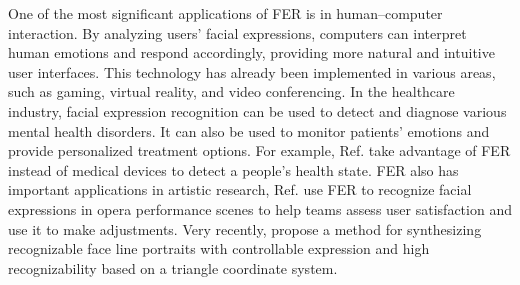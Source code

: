 \documentclass{article}
\begin{document}
One of the most significant applications of FER is in human--computer interaction. By analyzing users’ facial expressions, computers can interpret human emotions and respond accordingly, providing more natural and intuitive user interfaces. This technology has already been implemented in various areas, such as gaming, virtual reality, and video conferencing. In the healthcare industry, facial expression recognition can be used to detect and diagnose various mental health disorders. It can also be used to monitor patients’ emotions and provide personalized treatment options. For example, {Ref.} \cite{app13053259} take advantage of FER instead of medical devices to detect a people's health state. FER also has important applications in artistic research, {Ref.} \cite{s23052688} use FER to recognize facial expressions in opera performance scenes to help teams assess user satisfaction and use it to make adjustments. {Very recently,} \cite{dong2023recognizable} {propose a method for synthesizing recognizable face line portraits with controllable expression and high recognizability based on a triangle coordinate system.}
\end{document}
